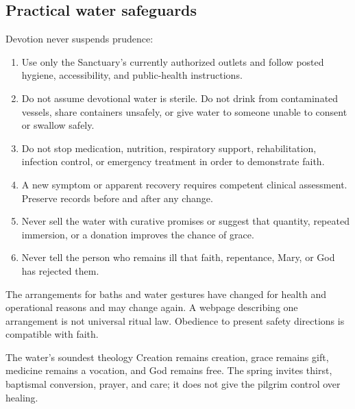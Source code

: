 \subsection{Practical water safeguards}

Devotion never suspends prudence:

\begin{enumerate}
  \item Use only the Sanctuary's currently authorized outlets and follow posted hygiene, accessibility, and public-health instructions.
  \item Do not assume devotional water is sterile. Do not drink from contaminated vessels, share containers unsafely, or give water to someone unable to consent or swallow safely.
  \item Do not stop medication, nutrition, respiratory support, rehabilitation, infection control, or emergency treatment in order to demonstrate faith.
  \item A new symptom or apparent recovery requires competent clinical assessment. Preserve records before and after any change.
  \item Never sell the water with curative promises or suggest that quantity, repeated immersion, or a donation improves the chance of grace.
  \item Never tell the person who remains ill that faith, repentance, Mary, or God has rejected them.
\end{enumerate}

The arrangements for baths and water gestures have changed for health and operational reasons and may change again. A webpage describing one arrangement is not universal ritual law. Obedience to present safety directions is compatible with faith.

\begin{studybox}{The water's soundest theology}
Creation remains creation, grace remains gift, medicine remains a vocation, and God remains free. The spring invites thirst, baptismal conversion, prayer, and care; it does not give the pilgrim control over healing.
\end{studybox}
